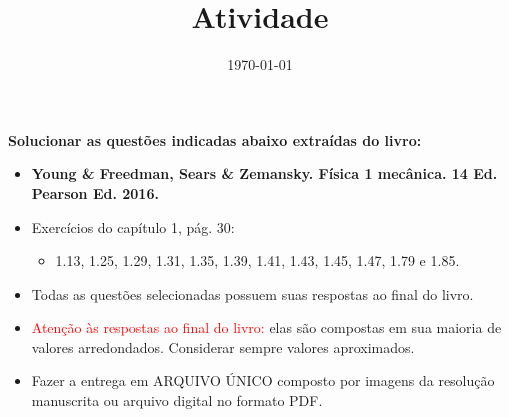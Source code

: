 \documentclass[a4paper, 11pt]{article}
\date{\today}
\title{Atividade}
\begin{document}
    \header{}
    \vspace{6pt}
    \textbf{Solucionar as questões indicadas abaixo extraídas do livro:}
    \begin{itemize}
        \item \textbf{Young \& Freedman, Sears \& Zemansky. Física 1 mecânica. 14 Ed. Pearson Ed. 2016.}
        \item Exercícios do capítulo 1, pág. 30:
        \begin{itemize}
            \item 1.13, 1.25, 1.29, 1.31, 1.35, 1.39, 1.41, 1.43, 1.45, 1.47, 1.79 e 1.85.
        \end{itemize}
        \item Todas as questões selecionadas possuem suas respostas ao final do livro.
        \item \textcolor{red}{Atenção às respostas ao final do livro:} elas são compostas em sua maioria de valores arredondados. Considerar sempre valores aproximados.
        \item Fazer a entrega em ARQUIVO ÚNICO composto por imagens da resolução manuscrita ou arquivo digital no formato PDF. 
    \end{itemize}
    
\end{document}
